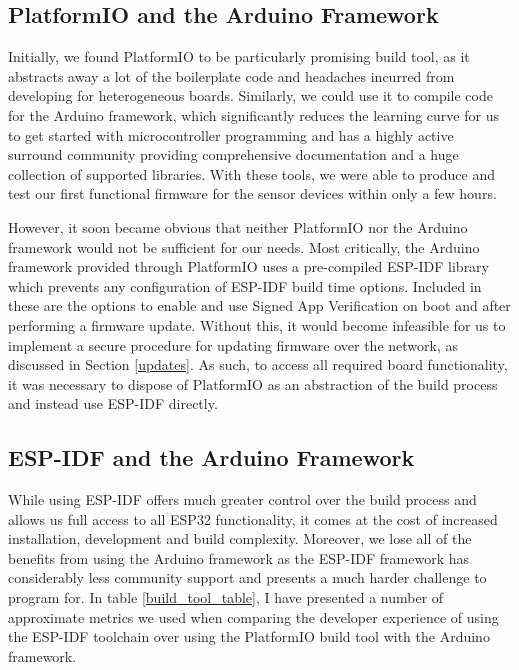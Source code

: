 \documentclass[conference]{IEEEtran}
\begin{document}
\subsection{PlatformIO and the Arduino Framework}

Initially, we found PlatformIO to be particularly promising build tool, as it abstracts away a lot of the boilerplate code and headaches incurred from developing for heterogeneous boards. Similarly, we could use it to compile code for the Arduino framework, which significantly reduces the learning curve for us to get started with microcontroller programming and has a highly active surround community providing comprehensive documentation and a huge collection of supported libraries. With these tools, we were able to produce and test our first functional firmware for the sensor devices within only a few hours.

However, it soon became obvious that neither PlatformIO nor the Arduino framework would not be sufficient for our needs. Most critically, the Arduino framework provided through PlatformIO uses a pre-compiled ESP-IDF library which prevents any configuration of ESP-IDF build time options. Included in these are the options to enable and use Signed App Verification on boot and after performing a firmware update. Without this, it would become infeasible for us to implement a secure procedure for updating firmware over the network, as discussed in Section \ref{updates}. As such, to access all required board functionality, it was necessary to dispose of PlatformIO as an abstraction of the build process and instead use ESP-IDF directly.

\subsection{ESP-IDF and the Arduino Framework}

While using ESP-IDF offers much greater control over the build process and allows us full access to all ESP32 functionality, it comes at the cost of increased installation, development and build complexity. Moreover, we lose all of the benefits from using the Arduino framework as the ESP-IDF framework has considerably less community support and presents a much harder challenge to program for. In table \ref{build_tool_table}, I have presented a number of approximate metrics we used when comparing the developer experience of using the ESP-IDF toolchain over using the PlatformIO build tool with the Arduino framework.
\end{document}
